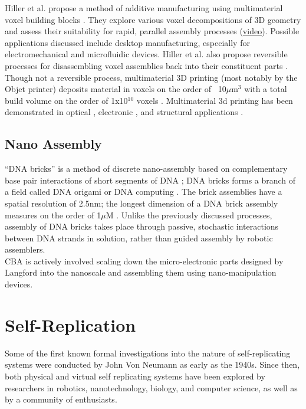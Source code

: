 {Hiller et al. propose a method of additive manufacturing using multimaterial voxel building blocks \cite{Hiller2009a}.  They explore various voxel decompositions of 3D geometry and assess their suitability for rapid, parallel assembly processes (\href{https://www.youtube.com/watch?v=-szjlhVMGh4}{video}).  Possible applications discussed include desktop manufacturing, especially for electromechanical and microfluidic devices.  Hiller et al. also propose reversible processes for disassembling voxel assemblies back into their constituent parts \cite{Hiller2005}.
\\

Though not a reversible process, multimaterial 3D printing (most notably by the Objet printer) deposits material in voxels on the order of ~10$\mu$m$^{3}$ with a total build volume on the order of 1x10$^{10}$ voxels \cite{Objet1000}.  Multimaterial 3d printing has been demonstrated in optical \cite{Willis2012}, electronic \cite{Ahn2009}, and structural applications \cite{Skouras2013} \cite{Schumacher} \cite{Bacher2014}.

\subsection{Nano Assembly}

``DNA bricks'' is a method of discrete nano-assembly based on complementary base pair interactions of short segments of DNA \cite{Ke2012}; DNA bricks forms a branch of a field called DNA origami \cite{Rothemund2006} or DNA computing \cite{Seeman1982} \cite{Adleman1994}.  The brick assemblies have a spatial resolution of 2.5nm; the longest dimension of a DNA brick assembly measures on the order of 1$\mu$M \cite{Ke2014}.  Unlike the previously discussed processes, assembly of DNA bricks takes place through passive, stochastic interactions between DNA strands in solution, rather than guided assembly by robotic assemblers.
\\

CBA is actively involved scaling down the micro-electronic parts designed by Langford \cite{Langford2014} into the nanoscale and assembling them using nano-manipulation devices.

\section{Self-Replication}

Some of the first known formal investigations into the nature of self-replicating systems were conducted by John Von Neumann as early as the 1940s.  Since then, both physical and virtual self replicating systems have been explored by researchers in robotics, nanotechnology, biology, and computer science, as well as by a community of enthusiasts.\\

}
